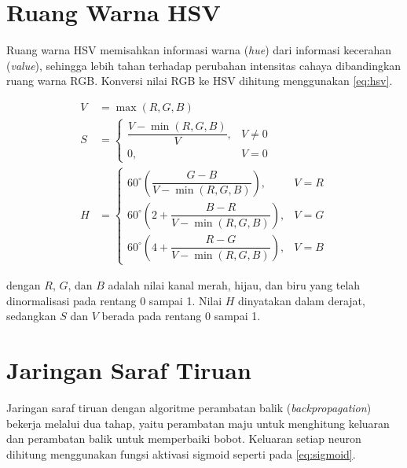 \section{Ruang Warna HSV}

Ruang warna HSV memisahkan informasi warna (\textit{hue}) dari
informasi kecerahan (\textit{value}), sehingga lebih tahan terhadap
perubahan intensitas cahaya dibandingkan ruang warna RGB. Konversi
nilai RGB ke HSV dihitung menggunakan \cref{eq:hsv}.

\begin{equation}
\begin{aligned}
V &= \max(R,G,B) \\
S &= \begin{cases}
       \dfrac{V-\min(R,G,B)}{V}, & V \neq 0 \\[6pt]
       0, & V = 0
     \end{cases} \\
H &= \begin{cases}
       60^{\circ}\left(\dfrac{G-B}{V-\min(R,G,B)}\right), & V = R \\[6pt]
       60^{\circ}\left(2+\dfrac{B-R}{V-\min(R,G,B)}\right), & V = G \\[6pt]
       60^{\circ}\left(4+\dfrac{R-G}{V-\min(R,G,B)}\right), & V = B
     \end{cases}
\end{aligned}
\label{eq:hsv}
\end{equation}

\noindent dengan $R$, $G$, dan $B$ adalah nilai kanal merah, hijau, dan
biru yang telah dinormalisasi pada rentang 0 sampai 1. Nilai $H$
dinyatakan dalam derajat, sedangkan $S$ dan $V$ berada pada rentang 0
sampai 1.

\section{Jaringan Saraf Tiruan}

Jaringan saraf tiruan dengan algoritme perambatan balik
(\textit{backpropagation}) bekerja melalui dua tahap, yaitu perambatan
maju untuk menghitung keluaran dan perambatan balik untuk memperbaiki
bobot. Keluaran setiap neuron dihitung menggunakan fungsi aktivasi
sigmoid seperti pada \cref{eq:sigmoid}.

